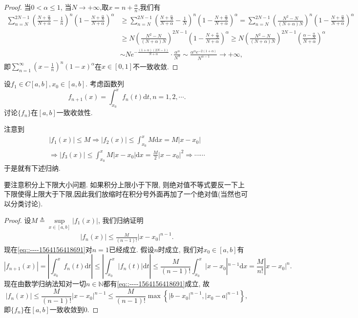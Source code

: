 \documentclass[../../main.tex]{subfiles}
\begin{document}
\begin{proof}
当$0<\alpha\leqslant1$, 当$N\to+\infty$,取$x=n+\frac{\alpha}{n}$,我们有
$$
\begin{aligned}
\sum_{n=N}^{2N-1}{\left( \frac{N+\frac{\alpha}{N}}{N+\alpha}-\frac{1}{n} \right) ^n\left( 1-\frac{N+\frac{\alpha}{N}}{N+\alpha} \right) ^{\alpha}}&\geqslant \sum_{n=N}^{2N-1}{\left( \frac{N+\frac{\alpha}{N}}{N+\alpha}-\frac{1}{N} \right) ^n\left( 1-\frac{N+\frac{\alpha}{N}}{N+\alpha} \right) ^{\alpha}}
=\sum_{n=N}^{2N-1}{\left( \frac{N^2-N}{(N+\alpha )N} \right) ^n\left( 1-\frac{N+\frac{\alpha}{N}}{N+\alpha} \right) ^{\alpha}}
\\
&\geqslant N\left( \frac{N^2-N}{(N+\alpha )N} \right) ^{2N-1}\left( 1-\frac{N+\frac{\alpha}{N}}{N+\alpha} \right) ^{\alpha}
\geqslant N\left( \frac{N^2-N}{(N+\alpha )N} \right) ^{2N-1}\left( \frac{\alpha -\frac{\alpha}{N}}{N+\alpha} \right) ^{\alpha}
\\
&\sim Ne^{-\frac{\left( 1+\alpha \right) \left( 2N-1 \right)}{N+\alpha}}\cdot \frac{\alpha ^{\alpha}}{N^{\alpha}}\sim \frac{\alpha ^{\alpha}e^{-2\left( 1+\alpha \right)}}{N^{\alpha -1}}\rightarrow +\infty ,
\end{aligned}
$$
即$\sum\limits_{n=1}^{\infty}\left(x-\frac{1}{n}\right)^n(1-x)^\alpha$在$x\in[0,1]$不一致收敛.
\end{proof}

\begin{example}
设$f_1\in C[a,b],x_0\in[a,b]$. 考虑函数列
$$
f_{n+1}(x)=\int_{x_0}^{x}f_n(t)\mathrm{d}t,n=1,2,\cdots.
$$
讨论$\{f_n\}$在$[a,b]$一致收敛性.
\end{example}
\begin{note}
注意到
\begin{gather*}
\left| f_1\left( x \right) \right|\leqslant M\Rightarrow \left| f_2\left( x \right) \right|\leqslant \int_{x_0}^x{M\mathrm{d}x}=M\left| x-x_0 \right|
\\
\Rightarrow \left| f_3\left( x \right) \right|\leqslant \int_{x_0}^x{M\left| x-x_0 \right|\mathrm{d}x}=\frac{M}{2}\left| x-x_0 \right|^2\Rightarrow \cdots \cdots 
\end{gather*}
于是就有下述归纳.
\end{note}
\begin{remark}
要注意积分上下限大小问题. 如果积分上限小于下限, 则绝对值不等式要反一下上下限使得上限大于下限,因此我们放缩时在积分号外面再加了一个绝对值(当然也可以分类讨论).
\end{remark}
\begin{proof}
设$M\triangleq\sup\limits_{x\in[a,b]}|f_1(x)|$, 我们归纳证明
\begin{align}
|f_n(x)|\leqslant\frac{M}{(n-1)!}|x-x_0|^{n-1}\label{eq::----1564156418691}.
\end{align}
现在\eqref{eq::----1564156418691}对$n=1$已经成立. 假设$n$时成立, 我们对$x_0\in [a,b]$有
$$
|f_{n+1}(x)|=\left| \int_{x_0}^x{f_n(t)\mathrm{d}t} \right|\leqslant \left| \int_{x_0}^x{\left| f_n(t) \right|\mathrm{d}t} \right|\leqslant \frac{M}{(n-1)!}\int_{x_0}^x{|x}-x_0|^{n-1}\mathrm{d}x=\frac{M}{n!}|x-x_0|^n.
$$
现在由数学归纳法知对一切$n\in\mathbb{N}$都有\eqref{eq::----1564156418691}成立, 故
$$
|f_n(x)|\leqslant\frac{M}{(n-1)!}|x-x_0|^{n-1}\leqslant\frac{M}{(n-1)!}\max\left\{|b-x_0|^{n-1},|x_0-a|^{n-1}\right\},
$$
即$\{f_n\}$在$[a,b]$一致收敛到$0$.
\end{proof}
\end{document}
